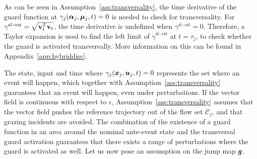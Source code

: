 \documentclass[../DC2019003Bouma.tex]{subfiles}
\begin{document}
\begin{sloppypar}
\begin{myremark}
As can be seen in Assumption~\ref{ass:transversality}, the time derivative of the guard function at $\gamma_j(\boldsymbol{\alpha}_j,\boldsymbol{\mu}_j,t) = 0$ is needed to check for transversality. For $\gamma^{\text{sl}\rightarrow\text{st}} = \sqrt{\mathbf{v}_t^T\mathbf{v}_t}$, the time derivative is undefined when $\gamma^{\text{sl}\rightarrow\text{st}} = 0$. Therefore, a Taylor expansion is used to find the left limit of $\dot{\gamma}^{\text{sl}\rightarrow\text{st}}$ at $t = \tau_j$, to check whether the guard is activated transversally. More information on this can be found in Appendix~\ref{app:hybriddisc}.
\end{myremark}
\end{sloppypar}



The state, input and time where $\gamma_j({\boldsymbol{x}}_j,{\boldsymbol{u}}_j,t) = 0$ represents the set where an event will happen, which together with Assumption~\ref{ass:transversality} guarantees that an event will happen, even under perturbations. If the vector field is continuous with respect to $\epsilon$, Assumption~\ref{ass:transversality} assumes that the vector field pushes the reference trajectory out of the flow set $\mathcal{C}_j$, and that grazing incidents are avoided. The combination of the existence of a guard function in an area around the nominal ante-event state and the transversal guard activation guarantees that there exists a range of perturbations where the guard is activated as well. Let us now pose an assumption on the jump map ${\boldsymbol{g}}$.
\end{document}
